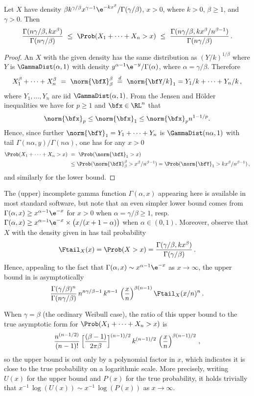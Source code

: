 \begin{proposition}\label{Prop:24.1a} Let $X$ have density $\beta k^{\gamma/\beta} x^{\gamma-1}\e^{-kx^\beta}
/\Gamma(\gamma/\beta)$, $x>0$, where $k>0$, $\beta\geq 1$, and $\gamma>0$. Then
\[ \frac{\Gamma(n\gamma/\beta,kx^\beta)}{\Gamma(n\gamma/\beta)}
\ \le\ \Prob(X_1 + \cdots + X_n > x)\ \le \
\frac{\Gamma(n\gamma/\beta,kx^\beta/n^{\beta-1})}{\Gamma(n\gamma/\beta)}\,.\]
\end{proposition}
\begin{proof}
An $X$ with the given density has the same distribution as $(Y/k)^{1/\beta}$
where $Y$ is $\GammaDist(\alpha,1)$ with density
$y^{\alpha-1}\e^{-y}/\Gamma(\alpha)$, where $\alpha=\gamma/\beta$.
Therefore
\[ X_1^\beta + \cdots + X_n^\beta\ =\ \norm{\bfX}_\beta^\beta \ \stackrel{d}{=} \ \norm{\bfY/k}_1=
Y_1/k+ \cdots + Y_n/k\,,\]
where $Y_1,\ldots,Y_n$ are iid $\GammaDist(\alpha,1)$.
From the Jensen and H\"older inequalities we have for $p\ge 1$ and $\bfx \in \RL^n$ that
$$ \norm{\bfx}_p \le  \norm{\bfx}_1 \le  \norm{\bfx}_p  n^{1- 1/p}. $$
Hence, since further $ \norm{\bfY}_1=Y_1+\cdots+Y_n$ is $\GammaDist(n\alpha,1)$ with tail $\Gamma(n\alpha,y)/
\Gamma(n\alpha)$, one has for any $x>0$
	\begin{align*}
	\Prob(X_1 + \cdots + X_n > x)\ &=\ \Prob( \norm{\bfX}_{1}>x ) \\
	&\le   \Prob( \norm{\bfX}_\beta^\beta >x^\beta/n^{\beta-1} )=
	\Prob( \norm{\bfY}_1>kx^\beta/n^{\beta-1} )\,,
	\end{align*}
and similarly for the lower bound.
\end{proof}
The (upper) incomplete gamma function $\Gamma(\alpha,x)$ appearing here is available in most
standard software, but note that an even simpler lower bound comes from
$\Gamma(\alpha,x)\ge x^{\alpha-1}\e^{-x}$ for $x>0$ when $\alpha = \gamma/\beta \geq 1$, resp.\
$\Gamma(\alpha,x)\ge x^{\alpha-1}\e^{-x} \times \bigl( x/(x+1-\alpha) \bigr)$
when $\alpha \in (0,1)$.
Moreover, observe that $X$ with the density given in \prop{Prop:24.1a} has tail probability
\[
\Ftail_X(x) = \Prob(X>x) = \frac{\Gamma(\gamma/\beta,k x^\beta)}{\Gamma(\gamma/\beta)}\,.
\]
Hence, appealing to the fact that $\Gamma(\alpha,x) \sim x^{\alpha-1} \e^{-x}$ as $x\to\infty$,
the upper bound in  is asymptotically
\[
\frac{\Gamma(\gamma/\beta)^n}{\Gamma(n\gamma/\beta)}\,n^{n\gamma/\beta -1} \, k^{n-1}\,\left(\frac{x}{n}\right)^{\beta(n-1)} \Ftail_X(x/n)^n\,.
\]

When $\gamma=\beta$ (the ordinary Weibull case), the ratio of this upper bound to the
true asymptotic form for $\Prob(X_1 + \cdots + X_n > x)$ is
\[
\frac{n^{(n-1/2)}}{(n-1)!}\,\Bigl[ \frac{(\beta-1)}{2\pi\beta}\Bigr]^{(n-1)/2} \,k^{(n-1)/2}\,\left(\frac{x}{n}\right)^{\beta(n-1)/2} \,,
\]
so the upper bound is out only by a polynomial factor in $x$, which indicates
it is close to the true probability on a logarithmic scale.
More precisely, writing $U(x)$ for the upper bound and $P(x)$ for the true probability,
it holds trivially that $x^{-1} \, \log(U(x)) \sim x^{-1} \, \log(P(x))$ as $x\to\infty$.

